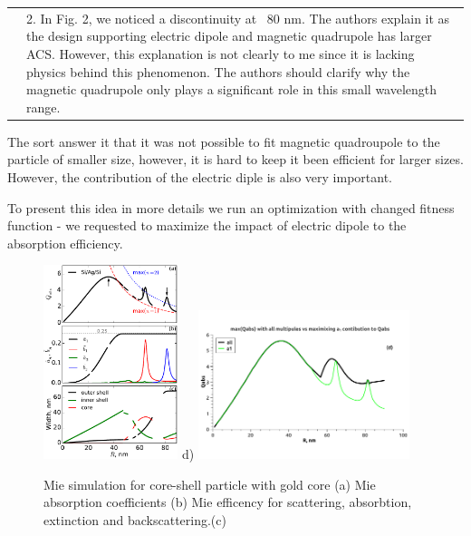 \documentclass[a4paper]{article}
\begin{document}

\begin{tabular}[!H]{l|p{}}
  \quad &  2.      In Fig. 2, we noticed a discontinuity at ~80
  nm. The authors explain it as the design supporting electric dipole
  and magnetic quadrupole has larger ACS. However, this explanation is
  not clearly to me since it is lacking physics behind this
  phenomenon. The authors should clarify why the magnetic quadrupole
  only plays a significant role in this small wavelength range. 
\end{tabular}

The sort answer it that it was not possible to fit magnetic quadroupole to the particle of
smaller size, however, it is hard to keep it been efficient for larger
sizes. However, the contribution of the electric diple is also
very important.

To present this idea in more details we run an optimization with
changed fitness function - we requested to maximize the impact of
electric dipole to the absorption efficiency.

\begin{figure}
  \includegraphics[width=0.35\textwidth]{overview-Qabs-a1}
  d)
   \includegraphics[width=0.55\textwidth]{overview-Qabs-all-a1}
  \caption{Mie simulation for core-shell particle with gold core (a)
    Mie absorption coefficients (b) Mie efficency for scattering,
    absorbtion, extinction and backscattering.(c)\label{fig:Au-core-shell}}
\end{figure}
\end{document}
